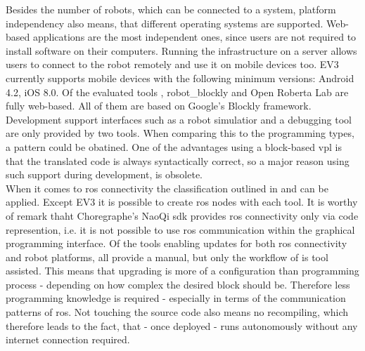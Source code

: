 Besides the number of robots, which can be connected to a system, platform independency also means, that different operating systems are supported. Web-based applications are the most independent ones, since users are not required to install software on their computers. Running the infrastructure on a server allows users to connect to the robot remotely and use it on mobile devices too. EV3 currently supports mobile devices with the following minimum versions: Android 4.2, iOS 8.0. Of the evaluated tools \toolname{}, robot\_blockly and Open Roberta Lab are fully web-based. All of them are based on Google's Blockly framework. \\

Development support interfaces such as a robot simulatior and a debugging tool are only provided by two tools. When comparing this to the programming types, a pattern could be obatined. One of the advantages using a block-based \gls{vpl} is that the translated code is always syntactically correct, so a major reason using such support during development, is obsolete. \\

When it comes to \gls{ros} connectivity the classification outlined in  and  can be applied. Except EV3 it is possible to create \gls{ros} nodes with each tool. It is worthy of remark thaht Choregraphe's NaoQi \gls{sdk} provides \gls{ros} connectivity only via code represention, i.e. it is not possible to use \gls{ros} communication within the graphical programming interface. Of the tools enabling updates for both \gls{ros} connectivity and robot platforms, all provide a manual, but only the workflow of \toolname{} is tool assisted. This means that upgrading is more of a configuration than programming process - depending on how complex the desired block should be. Therefore less programming knowledge is required - especially in terms of the communication patterns of \gls{ros}. Not touching the source code also means no recompiling, which therefore leads to the fact, that - once deployed - \toolname{} runs autonomously without any internet connection required.


